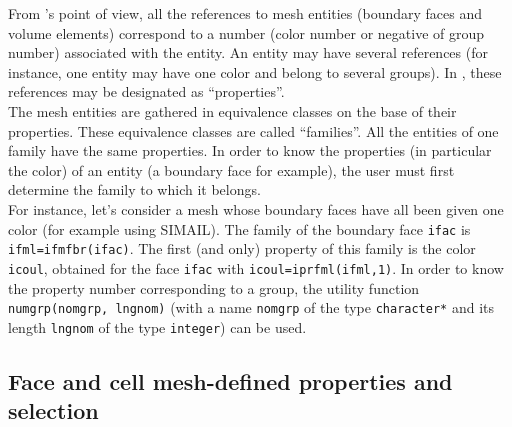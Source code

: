 {{{{From \CS 's point of view, all the references to mesh entities (boundary faces
and volume elements) correspond to a number (color number or negative
of group number) associated with the entity. An entity may have several
references (for instance, one entity may have one color and belong to
several groups). In \CS, these references may be designated as
``properties''. \\
The mesh entities are gathered in equivalence classes on the base of
their properties. These equivalence classes are called ``families''. All
the entities of one family have the same properties. In order to know
the properties (in particular the color) of an entity (a boundary face
for example), the user must first determine the family to which it
belongs. \\
For instance, let's consider a mesh whose boundary faces have all been
given one color (for example using SIMAIL). The family of the boundary
face \texttt{ifac} is \texttt{ifml=ifmfbr(ifac)}. The first (and only)
property of this family is the color \texttt{icoul}, obtained for the face
\texttt{ifac} with \texttt{icoul=iprfml(ifml,1)}. In order to know the
property number corresponding to a group, the utility function
\texttt{numgrp(nomgrp, lngnom)} (with a name
\texttt{nomgrp} of the type \texttt{character*} and its length
\texttt{lngnom} of the type \texttt{integer}) can be used.

\subsection{Face and cell mesh-defined properties and selection}
\label{sec:selection_criteria}

}}}}
